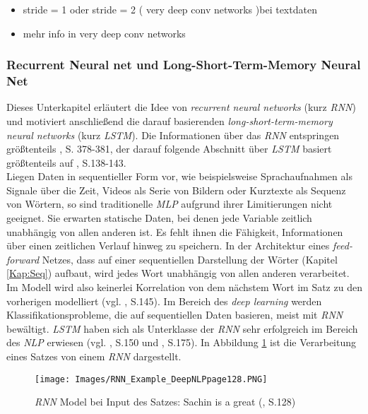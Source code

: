 \documentclass[a4paper,11pt]{article}
\begin{document}
\begin{itemize}
    \item stride = 1 oder stride = 2 ( very deep conv networks )bei textdaten
    \item mehr info in very deep conv networks
\end{itemize}{}



\subsubsection{Recurrent Neural net und Long-Short-Term-Memory Neural Net} \label{kap:LSTM}

Dieses Unterkapitel erläutert die Idee von \textit{recurrent neural networks} (kurz \textit{RNN}) und motiviert anschließend die darauf basierenden \textit{long-short-term-memory neural networks} (kurz \textit{LSTM}). Die Informationen über das \textit{RNN} entspringen größtenteils \cite{deepL}, S. 378-381, der darauf folgende Abschnitt über \textit{LSTM} basiert größtenteils auf \cite{deepNLP}, S.138-143.\\

Liegen Daten in sequentieller Form vor, wie beispielsweise Sprachaufnahmen als Signale über die Zeit, Videos als Serie von Bildern oder Kurztexte als Sequenz von Wörtern, so sind traditionelle \textit{MLP} aufgrund ihrer Limitierungen nicht geeignet. Sie erwarten statische Daten, bei denen jede Variable zeitlich unabhängig von allen anderen ist. Es fehlt ihnen die Fähigkeit, Informationen über einen zeitlichen Verlauf hinweg zu speichern. In der Architektur eines \textit{feed-forward} Netzes, dass auf einer sequentiellen Darstellung der Wörter (Kapitel \ref{Kap:Seq}) aufbaut, wird jedes Wort unabhängig von allen anderen verarbeitet. Im Modell wird also keinerlei Korrelation von dem nächstem Wort im Satz zu den vorherigen modelliert (vgl. \cite{deepEssentials}, S.145). Im Bereich des \textit{deep learning} werden Klassifikationsprobleme, die auf sequentiellen Daten basieren, meist mit \textit{RNN} bewältigt. \textit{LSTM} haben sich als Unterklasse der \textit{RNN} sehr erfolgreich im Bereich des \textit{NLP} erwiesen (vgl. \cite{deepEssentials}, S.150 und \cite{keras}, S.175). In Abbildung \ref{abb:RNNExample} ist die Verarbeitung eines Satzes von einem \textit{RNN} dargestellt.

\begin{figure}[!ht]
\begin{center}
\texttt{[image: Images/RNN\_Example\_DeepNLPpage128.PNG]}
\caption{\textit{RNN} Model bei Input des Satzes: Sachin is a great (\cite{deepNLP}, S.128)}
\label{abb:RNNExample}
\end{center}
\end{figure}
\end{document}
